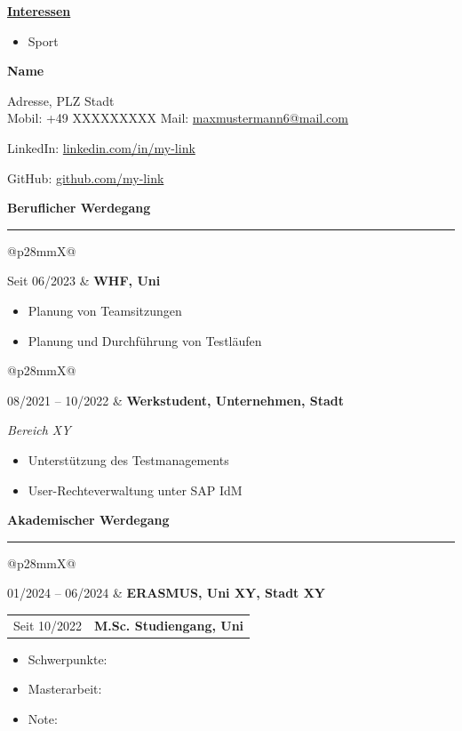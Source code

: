\documentclass[10pt,a4paper]{article}
\makeatletter
\newcommand{\sidehead}[1]{\vspace{1ex}\textbf{\large #1}\par\vspace{0.4em}}
\newcommand{\sectiontitle}[1]{\vspace{1.0em}\textbf{\large #1}\par\vspace{0.25em}\hrule\vspace{0.6em}}
\newcommand{\cventry}[3]{%
  \noindent
  \begin{tabularx}{\linewidth}{@{}p{28mm}X@{}}
    \raggedright\small\textsf{#1} & \textbf{#2} \\
  \end{tabularx}
  \vspace{0.2em}
  #3
  \vspace{0.8em}
}
\newlength{\photoH}
\makeatother
\begin{document}
\begin{paracol}{2}

\sidehead{\underline{Interessen}}
\begin{itemize}
  \item Sport
 \end{itemize}

\vfill

\switchcolumn
\raggedright\color{textgray}

\parbox[b][\photoH][t]{\linewidth}{%
  {\LARGE \textbf{Name}}\par \vspace{5mm}
  Adresse, PLZ Stadt \\
  Mobil: +49 XXXXXXXXX \quad
  Mail: \href{mailto:maxmustermann6@mail.com}{maxmustermann6@mail.com}\par
  LinkedIn: \href{https://linkedin.com/in/my-link}{linkedin.com/in/my-link} \par
  GitHub: \href{https://github.com/my-link}{github.com/my-link}
}

{\small
{}

\sectiontitle{Beruflicher Werdegang}

\cventry{Seit 06/2023}{WHF, Uni}{%
\begin{itemize}
  \item Planung von Teamsitzungen
  \item Planung und Durchführung von Testläufen
\end{itemize}} %

\cventry{08/2021 -- 10/2022}{Werkstudent, Unternehmen, Stadt}{%
\textit{Bereich XY}
\begin{itemize}
  \item Unterstützung des Testmanagements
  \item User-Rechteverwaltung unter SAP IdM
\end{itemize}} %
} %


{\small
{}

\sectiontitle{Akademischer Werdegang}

\cventry{01/2024 -- 06/2024}{ERASMUS, Uni XY, Stadt XY}{}

\cventry{Seit 10/2022}{M.Sc. Studiengang, Uni}{%
\begin{itemize}
  \item Schwerpunkte: 
  \item Masterarbeit: 
  \item Note:
\end{itemize}} %

}
\end{paracol}
\end{document}
